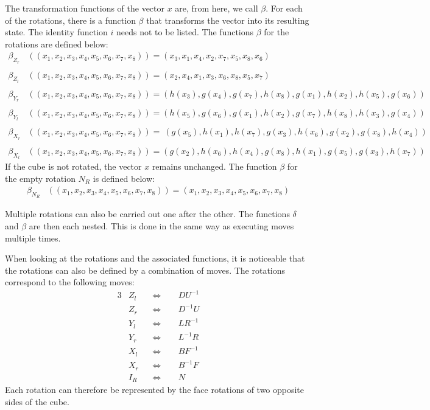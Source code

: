 The transformation functions of the vector $x$ are, from here, we call $\beta$. For each of the rotations, there is a function $\beta$ that transforms the vector into its resulting state. The identity function $i$ needs not to be listed. The functions $\beta$ for the rotations are defined below:
\begin{align*}
\beta_{Z_r}  & \left( (x_1, x_2, x_3, x_4, x_5,x_6,x_7,x_8) \right) = (x_3, x_1, x_4, x_2, x_7, x_5, x_8, x_6) \\
\\
\beta_{Z_l}  &   \left( (x_1, x_2, x_3, x_4, x_5,x_6,x_7,x_8) \right)  = (x_2, x_4, x_1, x_3, x_6, x_8, x_5, x_7) \\
\\
\beta_{Y_r}  &  \left( (x_1, x_2, x_3, x_4, x_5,x_6,x_7,x_8)  \right) =  (h(x_3), g(x_4), g(x_7), h(x_8), g(x_1), h(x_2), h(x_5), g(x_6)) \\
\\
\beta_{Y_l}  &   \left( (x_1, x_2, x_3, x_4, x_5,x_6,x_7,x_8) \right)  = (h(x_5), g(x_6), g(x_1), h(x_2),g(x_7),h(x_8),h(x_3),g(x_4)) \\
\\
\beta_{X_r}  &  \left( (x_1, x_2, x_3, x_4, x_5,x_6,x_7,x_8)  \right) = \ (g(x_5), h(x_1), h(x_7), g(x_3), h(x_6), g(x_2), g(x_8),h(x_4)) \\
\\
\beta_{X_l}  &  \left( (x_1, x_2, x_3, x_4, x_5,x_6,x_7,x_8) \right)  =  (g(x_2), h(x_6), h(x_4),g(x_8), h(x_1), g(x_5), g(x_3), h(x_7)) 
\end{align*}
If the cube is not rotated, the vector $x$ remains unchanged. The function $\beta$ for the empty rotation $N_R$ is defined below:
\begin{align*}
\beta_{N_R} & \left( (x_1, x_2, x_3, x_4, x_5,x_6,x_7,x_8) \right) = (x_1, x_2, x_3, x_4, x_5,x_6,x_7,x_8)
\end{align*}

Multiple rotations can also be carried out one after the other. The functions $\delta$ and $\beta$ are then each nested. This is done in the same way as executing moves multiple times.

When looking at the rotations and the associated functions, it is noticeable that the rotations can also be defined by a combination of moves. \newpage The rotations correspond to the following moves:
\begin{alignat*}{3}
& Z_l && \Leftrightarrow \ \ && D U^{-1} \\
& Z_r && \Leftrightarrow && D^{-1} U \\
& Y_l && \Leftrightarrow && L R^{-1} \\
& Y_r && \Leftrightarrow && L^{-1} R \\
& X_l && \Leftrightarrow && B F^{-1} \\
& X_r && \Leftrightarrow && B^{-1} F \\
& I_R && \Leftrightarrow && N
\end{alignat*}
Each rotation can therefore be represented by the face rotations of two opposite sides of the cube.

